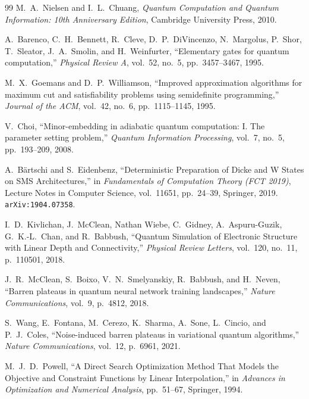 \documentclass[11pt,a4paper,oneside,openany]{ltjsbook}
\theoremstyle{definition}
\theoremstyle{plain}
\theoremstyle{remark}
\begin{document}
\begin{thebibliography}{99}
M.~A.~Nielsen and I.~L.~Chuang,
\newblock \textit{Quantum Computation and Quantum Information: 10th Anniversary Edition},
\newblock Cambridge University Press, 2010.

A.~Barenco, C.~H.~Bennett, R.~Cleve, D.~P.~DiVincenzo, N.~Margolus, P.~Shor, T.~Sleator, J.~A.~Smolin, and H.~Weinfurter,
\newblock ``Elementary gates for quantum computation,''
\newblock \textit{Physical Review A}, vol.~52, no.~5, pp.~3457--3467, 1995.

M.~X.~Goemans and D.~P.~Williamson,
\newblock ``Improved approximation algorithms for maximum cut and satisfiability problems using semidefinite programming,''
\newblock \textit{Journal of the ACM}, vol.~42, no.~6, pp.~1115--1145, 1995.

V.~Choi,
\newblock ``Minor-embedding in adiabatic quantum computation: I. The parameter setting problem,''
\newblock \textit{Quantum Information Processing}, vol.~7, no.~5, pp.~193--209, 2008.

A.~B{\"a}rtschi and S.~Eidenbenz,
\newblock ``Deterministic Preparation of Dicke and W States on SMS Architectures,''
\newblock in \textit{Fundamentals of Computation Theory (FCT 2019)}, Lecture Notes in Computer Science, vol.~11651, pp.~24--39, Springer, 2019. \texttt{arXiv:1904.07358}.

I.~D.~Kivlichan, J.~McClean, Nathan Wiebe, C.~Gidney, A.~Aspuru-Guzik, G.~K.-L.~Chan, and R.~Babbush,
\newblock ``Quantum Simulation of Electronic Structure with Linear Depth and Connectivity,''
\newblock \textit{Physical Review Letters}, vol.~120, no.~11, p.~110501, 2018.

J.~R.~McClean, S.~Boixo, V.~N.~Smelyanskiy, R.~Babbush, and H.~Neven,
\newblock ``Barren plateaus in quantum neural network training landscapes,''
\newblock \textit{Nature Communications}, vol.~9, p.~4812, 2018.

S.~Wang, E.~Fontana, M.~Cerezo, K.~Sharma, A.~Sone, L.~Cincio, and P.~J.~Coles,
\newblock ``Noise-induced barren plateaus in variational quantum algorithms,''
\newblock \textit{Nature Communications}, vol.~12, p.~6961, 2021.

M.~J.~D.~Powell,
\newblock ``A Direct Search Optimization Method That Models the Objective and Constraint Functions by Linear Interpolation,''
\newblock in \textit{Advances in Optimization and Numerical Analysis}, pp.~51--67, Springer, 1994.


\end{thebibliography}
\end{document}
